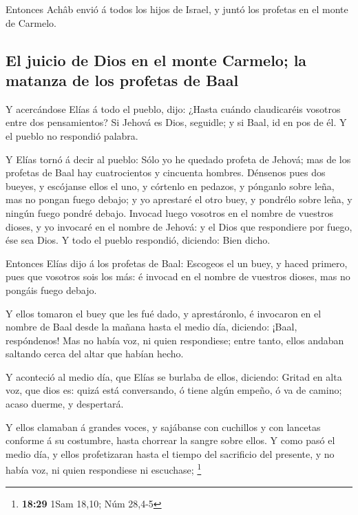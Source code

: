  Entonces Achâb envió á todos los hijos de Israel, y
juntó los profetas en el monte de Carmelo.

\hypertarget{el-juicio-de-dios-en-el-monte-carmelo-la-matanza-de-los-profetas-de-baal}{%
\subsection{El juicio de Dios en el monte Carmelo; la matanza de los
profetas de
Baal}\label{el-juicio-de-dios-en-el-monte-carmelo-la-matanza-de-los-profetas-de-baal}}

 Y acercándose Elías á todo el pueblo, dijo: ¿Hasta
cuándo claudicaréis vosotros entre dos pensamientos? Si Jehová es Dios,
seguidle; y si Baal, id en pos de él. Y el pueblo no respondió palabra.

 Y Elías tornó á decir al pueblo: Sólo yo he quedado
profeta de Jehová; mas de los profetas de Baal hay cuatrocientos y
cincuenta hombres.  Dénsenos pues dos bueyes, y escójanse
ellos el uno, y córtenlo en pedazos, y pónganlo sobre leña, mas no
pongan fuego debajo; y yo aprestaré el otro buey, y pondrélo sobre leña,
y ningún fuego pondré debajo.  Invocad luego vosotros en
el nombre de vuestros dioses, y yo invocaré en el nombre de Jehová: y el
Dios que respondiere por fuego, ése sea Dios. Y todo el pueblo
respondió, diciendo: Bien dicho.

 Entonces Elías dijo á los profetas de Baal: Escogeos el
un buey, y haced primero, pues que vosotros sois los más: é invocad en
el nombre de vuestros dioses, mas no pongáis fuego debajo.

 Y ellos tomaron el buey que les fué dado, y
aprestáronlo, é invocaron en el nombre de Baal desde la mañana hasta el
medio día, diciendo: ¡Baal, respóndenos! Mas no había voz, ni quien
respondiese; entre tanto, ellos andaban saltando cerca del altar que
habían hecho.

 Y aconteció al medio día, que Elías se burlaba de ellos,
diciendo: Gritad en alta voz, que dios es: quizá está conversando, ó
tiene algún empeño, ó va de camino; acaso duerme, y despertará.

 Y ellos clamaban á grandes voces, y sajábanse con
cuchillos y con lancetas conforme á su costumbre, hasta chorrear la
sangre sobre ellos.  Y como pasó el medio día, y ellos
profetizaran hasta el tiempo del sacrificio del presente, y no había
voz, ni quien respondiese ni escuchase; \footnote{\textbf{18:29} 1Sam
  18,10; Núm 28,4-5}

